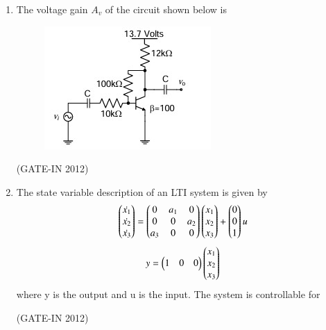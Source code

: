 \documentclass[journal,12pt,onecolumn]{IEEEtran}
\theoremstyle{remark}
\begin{document}
\begin{enumerate}
\item The voltage gain $A_v$ of the circuit shown below is
\begin{figure}[H]
    \centering
    \includegraphics[width=0.6\columnwidth]{figs/a13.jpg}
    \caption*{}
    \label{fig:a13}
\end{figure}

\hfill{(GATE-IN 2012)}
\begin{enumerate}
\end{enumerate}

\item The state variable description of an LTI system is given by
\begin{align*}
\begin{pmatrix}\dot{x_1} \\ \dot{x_2} \\ \dot{x_3}\end{pmatrix} = \begin{pmatrix}0 & a_1 & 0 \\ 0 & 0 & a_2 \\ a_3 & 0 & 0\end{pmatrix} \begin{pmatrix}x_1 \\ x_2 \\ x_3\end{pmatrix} + \begin{pmatrix}0 \\ 0 \\ 1\end{pmatrix}u
    \end{align*}
    \begin{align*}
y = \begin{pmatrix}1 & 0 & 0\end{pmatrix} \begin{pmatrix}x_1 \\ x_2 \\ x_3\end{pmatrix}
    \end{align*}
where y is the output and u is the input. The system is controllable for

\hfill{(GATE-IN 2012)}
\begin{enumerate}
\end{enumerate}


\end{enumerate}
\end{document}
